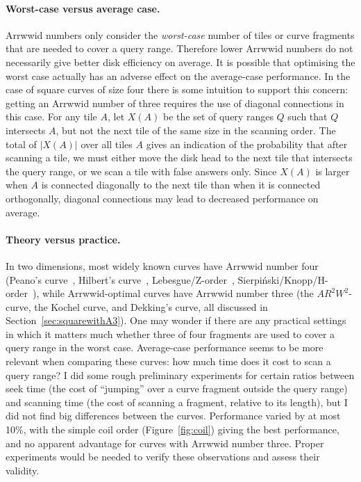\documentclass[11pt,a4paper]{article}
\newcommand{\ARRWW}{$AR^2W^2$\xspace}
\begin{document}
\paragraph{Worst-case versus average case.}
Arrwwid numbers only consider the \emph{worst-case} number of tiles or curve fragments that are needed to cover a query range. Therefore lower Arrwwid numbers do not necessarily give better disk efficiency on average. It is possible that optimising the worst case actually has an adverse effect on the average-case performance. In the case of square curves of size four there is some intuition to support this concern: getting an Arrwwid number of three requires the use of diagonal connections in this case. For any tile $A$, let $X(A)$ be the set of query ranges $Q$ such that $Q$ intersects $A$, but not the next tile of the same size in the scanning order. The total of $|X(A)|$ over all tiles $A$ gives an indication of the probability that after scanning a tile, we must either move the disk head to the next tile that intersects the query range, or we scan a tile with false answers only. Since $X(A)$ is larger when $A$ is connected diagonally to the next tile than when it is connected orthogonally, diagonal connections may lead to decreased performance on average.

\paragraph{Theory versus practice.}
In two dimensions, most widely known curves have Arrwwid number four (Peano's curve~\cite{Peano1890}, Hilbert's curve~\cite{Hilbert1891}, Lebesgue/Z-order~\cite{Lebesgue1904}, Sierpi\'nski/Knopp/H-order~\cite{Niedermeier2002,Sagan1994}), while Arrwwid-optimal curves have Arrwwid number three (the \ARRWW-curve, the Kochel curve, and Dekking's curve, all discussed in Section~\ref{sec:squarewithA3}). One may wonder if there are any practical settings in which it matters much whether three of four fragments are used to cover a query range in the worst case. Average-case performance seems to be more relevant when comparing these curves: how much time does it cost to scan a query range? I did some rough preliminary experiments for certain ratios between seek time (the cost of ``jumping'' over a curve fragment outside the query range) and scanning time (the cost of scanning a fragment, relative to its length), but I did not find big differences between the curves. Performance varied by at most 10\%, with the simple coil order (Figure~\ref{fig:coil}) giving the best performance, and no apparent advantage for curves with Arrwwid number three. Proper experiments would be needed to verify these observations and assess their validity.
\end{document}
